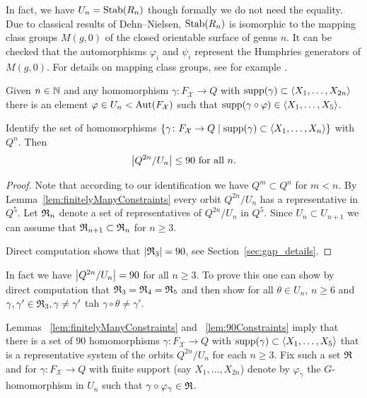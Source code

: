 \documentclass[a4paper,11pt]{amsart}
\begin{document}
\begin{re}
In fact, we have $U_n = \operatorname{Stab}(R_n)$ though formally we do not need the equality. 
Due to classical results of Dehn--Nielsen, $\operatorname{Stab}(R_n)$ is isomorphic to 
the mapping class groups $M(g,0)$ of the closed orientable surface of genus $n$. It can be checked that
the automorphisms $\varphi_i$ and $\psi_i$ represent the Humphries generators of $M(g,0)$.
For details on mapping class groups, see for example \cite{Farb-Margalit:MCG}.
\end{re}

\begin{lem}\label{lem:finitelyManyConstraints}
 Given $n\in \mathbb{N}$ and any homomorphism $\gamma\colon F_{\mathcal{X}} \to Q$ with $\operatorname{{supp}}(\gamma) \subset \left<X_1,\ldots ,X_{2n}\right>$
 there is an element $\varphi \in U_n<\operatorname{{Aut}}(F_{\mathcal{X}})$ such that $\operatorname{{supp}}(\gamma\circ\varphi) \in \left<X_1,\dotsc,X_5\right>$.
\end{lem}
\begin{lem}\label{lem:90Constraints}
 Identify the set of homomorphisms $\{\gamma \colon F_{\mathcal{X}} \to Q \mid \operatorname{{supp}}(\gamma) \subset \left<X_1,\ldots, X_n\right>\}$ with $Q^{n}$. 
 Then 
 \[\left|{Q^{2n}/U_n}\right|\leq 90 \text{ for all } n.\]
\end{lem}
\begin{proof}
{\let\al\alpha
\let\ga\gamma
\let\th\theta
Note that according to our identification we have $Q^m \subset Q^n$ for $m < n$.
By Lemma~\ref{lem:finitelyManyConstraints} every orbit $Q^{2n} / U_n$ has a representative in $Q^5$.
Let $\mathfrak{R}_n$ denote a set of representatives of $Q^{2n}/ U_n$ in $Q^5$. 
Since $U_n \subset U_{n+1}$ we can assume that $\mathfrak{R}_{n+1} \subset \mathfrak{R}_n$ for $n \ge 3$.


Direct computation shows that $|\mathfrak{R}_3| = 90$,
see Section~\ref{sec:gap_details}.
}
\end{proof}
\begin{re}
 In fact we have $\left|{Q^{2n}/U_n}\right|= 90$ for all $n\geq3$.
  To prove this one can show by direct computation that
   $\mathfrak{R}_3=\mathfrak{R}_4=\mathfrak{R}_5$ and then show for all $\theta\in U_n$,
    $n\geq6$ and $\gamma,\gamma'\in\mathfrak{R}_3,\gamma\neq\gamma'$
 tah $\gamma\circ \theta\neq\gamma'$.
\end{re}
  Lemmas ~\ref{lem:finitelyManyConstraints} and ~\ref{lem:90Constraints} imply that 
  there is a set of $90$ homomorphisms $\gamma : F_{\mathcal{X}} \to Q$
  with $\operatorname{{supp}}(\gamma) \subset \left<X_1,\ldots, X_5\right>$ that is a representative system of
  the orbits $Q^{2n} / U_n$ for each $n \ge 3$.
  Fix such a set $\mathfrak{R}$
and for
$\gamma \colon F_{\mathcal{X}} \to Q$ with finite support (say
$X_1,\dots,X_{2n}$) denote by $\varphi_\gamma$ the $G$-homomorphism in
$U_n$ such that $\gamma\circ \varphi_\gamma \in \mathfrak{R}$.
 
\end{document}
